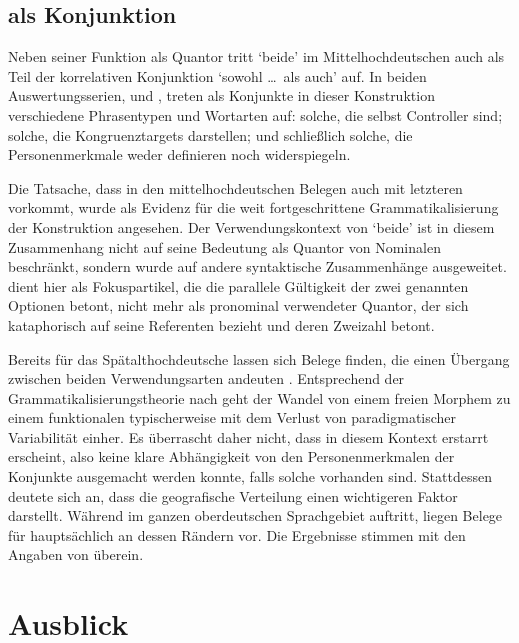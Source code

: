 \subsection{ als Konjunktion}

Neben seiner Funktion als Quantor tritt `beide' im
Mittelhochdeutschen auch als Teil der korrelativen
Konjunktion  `sowohl \dots\ als auch' auf. In beiden
Auswertungs\-serien, \CAO{} und \KC{}, treten als Konjunkte in dieser
Konstruktion verschiedene Phrasen\-typen und Wort\-arten auf: solche, die
selbst Controller sind; solche, die Kongruenztargets darstellen; und
schließlich solche, die Personenmerkmale weder definieren noch widerspiegeln.

Die Tatsache, dass  in den
mittelhochdeutschen Belegen auch mit letzteren vorkommt,
wurde als Evidenz für die weit fortgeschrittene Grammatikalisierung der
Konstruktion angesehen. Der Verwendungskontext von  `beide' ist in
diesem Zusammenhang nicht auf seine Bedeutung als Quantor von Nominalen
beschränkt, sondern wurde auf andere syntaktische Zusammenhänge ausgeweitet.
 dient hier als Fokuspartikel, die die parallele Gültigkeit der
zwei genannten Optionen betont, nicht mehr als pronominal verwendeter Quantor,
der sich kataphorisch auf seine Referenten bezieht und deren Zweizahl betont.

Bereits für das Spätalthochdeutsche lassen sich Belege
finden, die einen Übergang zwischen beiden Verwendungsarten andeuten
\autocite[vgl.\ die Beispiele in][627]{ksw2}. Entsprechend der
Grammatikalisierungstheorie nach \citet[146--150]{lehmann2015} geht der Wandel
von einem freien Morphem zu einem funktionalen typischerweise mit dem Verlust
von paradigmatischer Variabilität einher. Es überrascht daher nicht, dass
 in diesem Kontext erstarrt erscheint, also keine klare
Abhängigkeit von den Personenmerkmalen der Konjunkte ausgemacht werden konnte,
falls solche vorhanden sind. Stattdessen deutete sich an, dass die geografische
Verteilung einen wichtigeren Faktor darstellt. Während  im ganzen
oberdeutschen Sprachgebiet auftritt, liegen Belege für
 hauptsächlich an dessen Rändern vor. Die Ergebnisse stimmen mit
den Angaben von \citet[627--628]{ksw2} überein.

\section{Ausblick}

